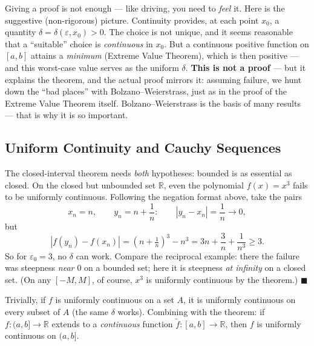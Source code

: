 \documentclass[11pt]{report}
\begin{document}
\begin{rembox}
Giving a proof is not enough --- like driving, you need to \emph{feel} it. Here is the suggestive (non-rigorous) picture. Continuity provides, at each point $x_0$, a quantity $\delta = \delta(\varepsilon, x_0) > 0$. The choice is not unique, and it seems reasonable that a ``suitable'' choice is \emph{continuous} in $x_0$. But a continuous positive function on $[a,b]$ attains a \emph{minimum} (Extreme Value Theorem), which is then positive --- and this worst-case value serves as the uniform $\delta$. \textbf{This is not a proof} --- but it explains the theorem, and the actual proof mirrors it: assuming failure, we hunt down the ``bad places'' with Bolzano--Weierstrass, just as in the proof of the Extreme Value Theorem itself. Bolzano--Weierstrass is the basis of many results --- that is why it is so important.
\end{rembox}

\subsection{Uniform Continuity and Cauchy Sequences}

\begin{exbox}
The closed-interval theorem needs \emph{both} hypotheses: bounded is as essential as closed. On the closed but unbounded set $\mathbb{R}$, even the polynomial $f(x) = x^3$ fails to be uniformly continuous. Following the negation format above, take the pairs
\[
x_n = n, \qquad y_n = n + \frac1n: \qquad |y_n - x_n| = \frac1n \to 0,
\]
but
\[
|f(y_n) - f(x_n)| = \left( n + \tfrac1n \right)^3 - n^3 = 3n + \frac{3}{n} + \frac{1}{n^3} \geq 3.
\]
So for $\varepsilon_0 = 3$, no $\delta$ can work. Compare the reciprocal example: there the failure was steepness \emph{near $0$} on a bounded set; here it is steepness \emph{at infinity} on a closed set. (On any $[-M, M]$, of course, $x^3$ is uniformly continuous by the theorem.) \hfill $\blacksquare$
\end{exbox}

\begin{propbox}
Trivially, if $f$ is uniformly continuous on a set $A$, it is uniformly continuous on every subset of $A$ (the same $\delta$ works). Combining with the theorem: if $f: (a, b] \to \mathbb{R}$ extends to a \emph{continuous} function $\tilde f: [a,b] \to \mathbb{R}$, then $f$ is uniformly continuous on $(a,b]$.
\end{propbox}
\end{document}
